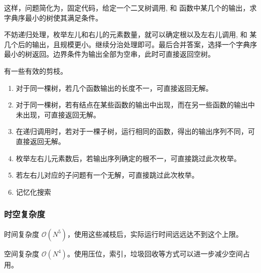 			这样，问题简化为，固定代码，给定一个二叉树调用,  和  函数中某几个的输出，求字典序最小的树使其满足条件。
			
			不妨递归处理，枚举左儿和右儿的元素数量，就可以确定根以及左右儿调用,  和  某几个后的输出，且规模更小。继续分治处理即可。最后合并答案，选择一个字典序最小的树返回。边界条件为输出全部为空串，此时可直接返回空树。
			
			有一些有效的剪枝。
			\begin{enumerate}
				\item 对于同一棵树，若几个函数输出的长度不一，可直接返回无解。
				\item 对于同一棵树，若有结点在某些函数的输出中出现，而在另一些函数的输出中未出现，可直接返回无解。
				\item 在递归调用时，若对于一棵子树，运行相同的函数，得出的输出序列不同，可直接返回无解。
				\item 枚举左右儿元素数后，若输出序列确定的根不一，可直接跳过此次枚举。
				\item 若左右儿对应的子问题有一个无解，可直接跳过此次枚举。
				\item 记忆化搜索
			\end{enumerate}
			\subsubsection{时空复杂度}
				时间复杂度 $\mathcal{O}\left(N^5\right)$，使用这些减枝后，实际运行时间远远达不到这个上限。
					
				空间复杂度 $\mathcal{O}\left(N^4\right)$。使用压位，索引，垃圾回收等方式可以进一步减少空间占用。
		\newpage